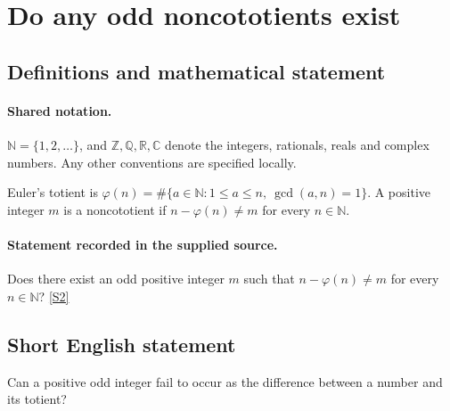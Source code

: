 \documentclass[11pt]{article}
\newcommand{\sref}[2]{\hyperlink{source:#1:#2}{[S#2]}}
\begin{document}
\section{Do any odd noncototients exist}\label{statement}

\subsection{Definitions and mathematical statement}

\paragraph{Shared notation.}$\mathbb N=\{1,2,\ldots\}$, and $\mathbb Z,\mathbb Q,\mathbb R,\mathbb C$ denote the integers, rationals, reals and complex numbers. Any other conventions are specified locally.


Euler's totient is $\varphi(n)=\#\{a\in\mathbb N:1\le a\le n,\ \gcd(a,n)=1\}$. A positive integer $m$ is a noncototient if $n-\varphi(n)\ne m$ for every $n\in\mathbb N$.
\paragraph{Statement recorded in the supplied source.}
Does there exist an odd positive integer $m$ such that $n-\varphi(n)\ne m$ for every $n\in\mathbb N$? \sref{statement}{2}
\subsection{Short English statement}
Can a positive odd integer fail to occur as the difference between a number and its totient?
\end{document}
